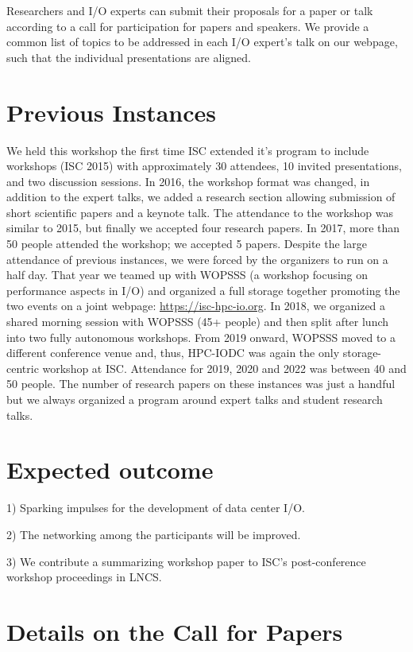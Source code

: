 \documentclass[a4paper,10pt]{article}
\begin{document}
Researchers and I/O experts can submit their proposals for a paper or talk according to a call for participation for papers and speakers.
We provide a common list of topics to be addressed in each I/O expert's talk on our webpage, such that the individual presentations are aligned.



\section{Previous Instances}

We held this workshop the first time ISC extended it's program to include workshops (ISC 2015) with approximately 30 attendees, 10 invited presentations, and two discussion sessions.
In 2016, the workshop format was changed, in addition to the expert talks, we added a research section allowing submission of short scientific papers and a keynote talk.
The attendance to the workshop was similar to 2015, but finally we accepted four research papers.
In 2017, more than 50 people attended the workshop; we accepted 5 papers. %
Despite the large attendance of previous instances, we were forced by the organizers to run on a half day.
That year we teamed up with WOPSSS (a workshop focusing on performance aspects in I/O) and organized a full storage together promoting the two events on a joint webpage: \url{https://isc-hpc-io.org}.
In 2018, we organized a shared morning session with WOPSSS (45+ people) and then split after lunch into two fully autonomous workshops.
From 2019 onward, WOPSSS moved to a different conference venue and, thus, HPC-IODC was again the only storage-centric workshop at ISC.
Attendance for 2019, 2020 and 2022 was between 40 and 50 people.
The number of research papers on these instances was just a handful but we always organized a program around expert talks and student research talks.

\section{Expected outcome}
1) Sparking impulses for the development of data center I/O.

2) The networking among the participants will be improved.

3) We contribute a summarizing workshop paper to ISC's post-conference workshop proceedings in LNCS.

\section{Details on the Call for Papers}
\end{document}
